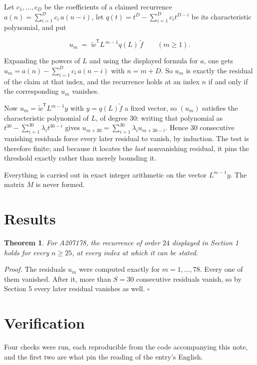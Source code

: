 \documentclass[11pt]{article}
\newtheorem{theorem}{Theorem}
\theoremstyle{definition}
\begin{document}
Let $c_1,\dots,c_D$ be the coefficients of a claimed recurrence $a(n) = \sum_{i=1}^{D} c_i\,a(n-i)$, let $q(t) = t^{D} - \sum_{i=1}^{D} c_i t^{D-i}$ be its characteristic polynomial, and put

\[u_m \;=\; \tilde w^{\mathsf T} L^{\,m-1} q(L)\,\tilde f \qquad (m \ge 1).\]

Expanding the powers of $L$ and using the displayed formula for $a$, one gets $u_m = a(n) - \sum_{i=1}^{D} c_i\,a(n-i)$ with $n = m + D$. So $u_m$ is exactly the residual of the claim at that index, and the recurrence holds at an index $n$ if and only if the corresponding $u_m$ vanishes.

Now $u_m = \tilde w^{\mathsf T} L^{m-1} y$ with $y = q(L)\tilde f$ a fixed vector, so $(u_m)$ satisfies the characteristic polynomial of $L$, of degree $30$: writing that polynomial as $t^{30} - \sum_{i=1}^{30} \lambda_i t^{30-i}$ gives $u_{m+30} = \sum_{i=1}^{30} \lambda_i u_{m+30-i}$. Hence $30$ consecutive vanishing residuals force every later residual to vanish, by induction. The test is therefore finite; and because it locates the {\itshape last} nonvanishing residual, it pins the threshold exactly rather than merely bounding it.

Everything is carried out in exact integer arithmetic on the vector $L^{m-1}y$. The matrix $M$ is never formed.

\section{Results}

\begin{theorem} For A207178, the recurrence of order $24$ displayed in Section 1 holds for every $n \ge 25$, at every index at which it can be stated.\end{theorem}

{\itshape Proof.} The residuals $u_m$ were computed exactly for $m = 1,\dots,78$. Every one of them vanished. After it, more than $S = 30$ consecutive residuals vanish, so by Section 5 every later residual vanishes as well. $\square$

\section{Verification}

Four checks were run, each reproducible from the code accompanying this note, and the first two are what pin the reading of the entry's English.
\end{document}
